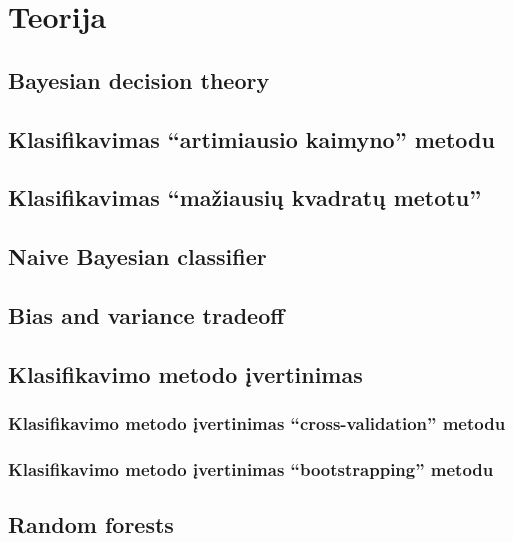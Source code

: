 \documentclass{article}
\begin{document}
\let \savenumberline \numberline
\def \numberline#1{\savenumberline{#1.}}
\tableofcontents

%





\section{Teorija}
\subsection{Bayesian decision theory}
\subsection{Klasifikavimas ``artimiausio kaimyno'' metodu}
\subsection{Klasifikavimas ``mažiausių kvadratų metotu''}
\subsection{Naive Bayesian classifier}
\subsection{Bias and variance tradeoff}
\subsection{Klasifikavimo metodo įvertinimas}
\subsubsection{Klasifikavimo metodo įvertinimas ``cross-validation'' metodu}
\subsubsection{Klasifikavimo metodo įvertinimas ``bootstrapping'' metodu}

\subsection{Random forests}
\end{document}
